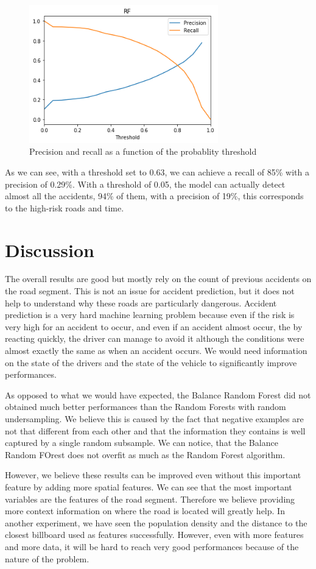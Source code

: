 \documentclass[conference]{IEEEtran}
\begin{document}
\begin{figure}[htbp]
\centerline{\includegraphics[height=6cm, keepaspectratio]{figures/pr.png}}
\caption{Precision and recall as a function of the probablity threshold}
\label{fig}
\end{figure}

As we can see, with a threshold set to 0.63, we can achieve a recall of 85\% with a precision of 0.29\%.
With a threshold of 0.05, the model can actually detect almost all the accidents, 94\% of them, with a precision of 19\%, this corresponds to the high-risk roads and time.

\section{Discussion}
The overall results are good but mostly rely on the count of previous accidents on the road segment.
This is not an issue for accident prediction, but it does not help to understand why these roads are particularly dangerous.
Accident prediction is a very hard machine learning problem because even if the risk is very high for an accident to occur, and even if an accident almost occur, the by reacting quickly, the driver can manage to avoid it although the conditions were almost exactly the same as when an accident occurs.
We would need information on the state of the drivers and the state of the vehicle to significantly improve performances.

As opposed to what we would have expected, the Balance Random Forest did not obtained much better performances than the Random Forests with random undersampling.
We believe this is caused by the fact that negative examples are not that different from each other and that the information they contains is well captured by a single random subsample.
We can notice, that the Balance Random FOrest does not overfit as much as the Random Forest algorithm.

However, we believe these results can be improved even without this important feature by adding more spatial features.
We can see that the most important variables are the features of the road segment.
Therefore we believe providing more context information on where the road is located will greatly help.
In another experiment, we have seen the population density and the distance to the closest billboard used as features successfully.
However, even with more features and more data, it will be hard to reach very good performances because of the nature of the problem.
\end{document}
